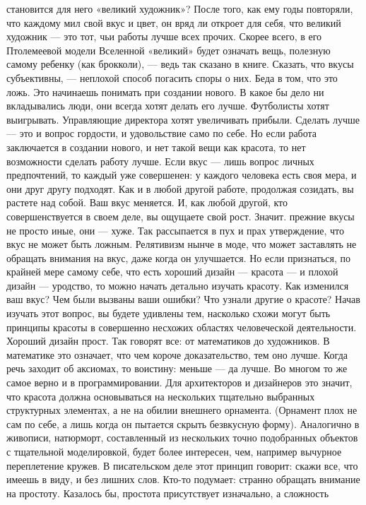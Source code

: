 \documentclass[ebook,12pt,oneside,openany]{memoir}
\begin{document}
становится для него «великий художник»? После того, как ему годы
повторяли, что каждому мил свой вкус и цвет, он вряд ли откроет для
себя, что великий художник — это тот, чьи работы лучше всех прочих.
Скорее всего, в его Птолемеевой модели Вселенной «великий» будет
означать вещь, полезную самому ребенку (как брокколи), — ведь так
сказано в книге. Сказать, что вкусы субъективны, — неплохой способ
погасить споры о них. Беда в том, что это ложь. Это начинаешь понимать
при создании нового. В какое бы дело ни вкладывались люди, они всегда
хотят делать его лучше. Футболисты хотят выигрывать. Управляющие
директора хотят увеличивать прибыли. Сделать лучше — это и вопрос
гордости, и удовольствие само по себе. Но если работа заключается в
создании нового, и нет такой вещи как красота, то нет возможности
сделать работу лучше. Если вкус — лишь вопрос личных предпочтений, то
каждый уже совершенен: у каждого человека есть своя мера, и они друг
другу подходят. Как и в любой другой работе, продолжая созидать, вы
растете над собой. Ваш вкус меняется. И, как любой другой, кто
совершенствуется в своем деле, вы ощущаете свой рост. Значит. прежние
вкусы не просто иные, они — хуже. Так рассыпается в пух и прах
утверждение, что вкус не может быть ложным. Релятивизм нынче в моде,
что может заставлять не обращать внимания на вкус, даже когда он
улучшается. Но если признаться, по крайней мере самому себе, что есть
хороший дизайн — красота — и плохой дизайн — уродство, то можно начать
детально изучать красоту. Как изменился ваш вкус? Чем были вызваны
ваши ошибки? Что узнали другие о красоте? Начав изучать этот вопрос,
вы будете удивлены тем, насколько схожи могут быть принципы красоты в
совершенно несхожих областях человеческой деятельности. Хороший дизайн
прост. Так говорят все: от математиков до художников. В математике это
означает, что чем короче доказательство, тем оно лучше. Когда речь
заходит об аксиомах, то воистину: меньше — да лучше. Во многом то же
самое верно и в программировании. Для архитекторов и дизайнеров это
значит, что красота должна основываться на нескольких тщательно
выбранных структурных элементах, а не на обилии внешнего орнамента.
(Орнамент плох не сам по себе, а лишь когда он пытается скрыть
безвкусную форму). Аналогично в живописи, натюрморт, составленный из
нескольких точно подобранных объектов с тщательной моделировкой, будет
более интересен, чем, например вычурное переплетение кружев. В
писательском деле этот принцип говорит: скажи все, что имеешь в виду,
и без лишних слов. Кто-то подумает: странно обращать внимание на
простоту. Казалось бы, простота присутствует изначально, а сложность
\end{document}
